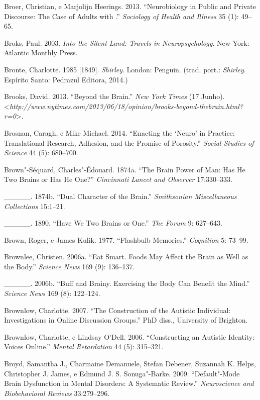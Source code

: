 {\begin{Parskip}
Broer, Christian, e Marjolijn Heerings. 2013. ``Neurobiology in Public
and Private Discourse: The Case of Adults with .'' \emph{Sociology
of Health and Illness} 35 (1): 49--65.

Broks, Paul. 2003. \emph{Into the Silent Land: Travels in
Neuropsychology}. New York: Atlantic Monthly Press.

Bronte, Charlotte. 1985 {[}1849{]}. \emph{Shirley}. London: Penguin.
(trad. port.: \emph{Shirley}. Espírito Santo: Pedrazul Editora, 2014.)

Brooks, David. 2013. ``Beyond the Brain.'' \emph{New York Times} (17
Junho).
\textless{}\emph{http://www.nytimes.com/2013/06/18/opinion/brooks-beyond-thebrain.html?r=0}\textgreater{}.

Brosnan, Caragh, e Mike Michael. 2014. ``Enacting the `Neuro' in
Practice: Translational Research, Adhesion, and the Promise of
Porosity.'' \emph{Social Studies of Science} 44 (5): 680--700.

Brown"-Séquard, Charles"-Édouard. 1874a. ``The Brain Power of Man: Has He
Two Brains or Has He One?'' \emph{Cincinnati Lancet and Observer}
17:330--333.

\_\_\_\_\_. 1874b. ``Dual Character of the Brain.'' \emph{Smithsonian
Miscellaneous Collections} 15:1--21.

\_\_\_\_\_. 1890. ``Have We Two Brains or One.'' \emph{The Forum} 9:
627--643.

Brown, Roger, e James Kulik. 1977. ``Flashbulb Memories.''
\emph{Cognition} 5: 73--99.

Brownlee, Christen. 2006a. ``Eat Smart. Foods May Affect the Brain as
Well as the Body.'' \emph{Science News} 169 (9): 136--137.

\_\_\_\_\_. 2006b. ``Buff and Brainy. Exercising the Body Can Benefit the
Mind.'' \emph{Science News} 169 (8): 122--124.

Brownlow, Charlotte. 2007. ``The Construction of the Autistic
Individual: Investigations in Online Discussion Groups.'' PhD diss.,
University of Brighton.

Brownlow, Charlotte, e Lindsay O'Dell. 2006. ``Constructing an Autistic
Identity:  Voices Online.'' \emph{Mental Retardation} 44 (5):
315--321.

Broyd, Samantha J., Charmaine Demanuele, Stefan Debener, Suzannah K.
Helps, Christopher J. James, e Edmund J. S. Sonuga"-Barke. 2009.
``Default"-Mode Brain Dysfunction in Mental Disorders: A Systematic
Review.'' \emph{Neuroscience and Biobehavioral Reviews} 33:279--296.


\end{Parskip}}
